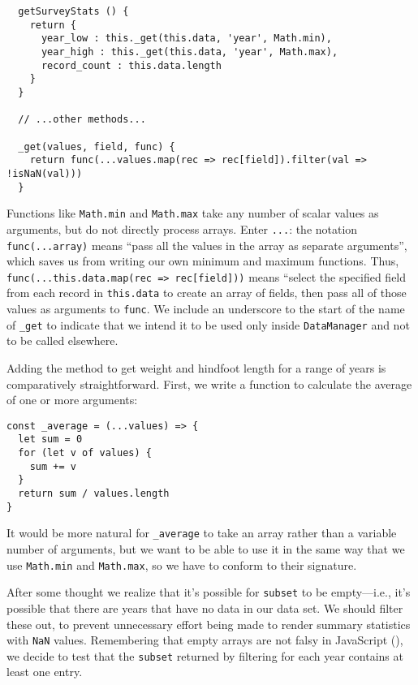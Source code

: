 \begin{verbatim}
  getSurveyStats () {
    return {
      year_low : this._get(this.data, 'year', Math.min),
      year_high : this._get(this.data, 'year', Math.max),
      record_count : this.data.length
    }
  }

  // ...other methods...

  _get(values, field, func) {
    return func(...values.map(rec => rec[field]).filter(val => !isNaN(val)))
  }
\end{verbatim}

Functions like \texttt{Math.min} and \texttt{Math.max} take any number of scalar values as arguments,
but do not directly process arrays.
Enter  \texttt{...}:
the notation \texttt{func(...array)} means
``pass all the values in the array as separate arguments'',
which saves us from writing our own minimum and maximum functions.
Thus,
\texttt{func(...this.data.map(rec\ =\textgreater{}\ rec[field]))} means
``select the specified field from each record in \texttt{this.data} to create an array of fields,
then pass all of those values as arguments to \texttt{func}.
We include an underscore to the start of the name of \texttt{\_get} to indicate that we
intend it to be used only inside \texttt{DataManager} and not to be called elsewhere.

Adding the method to get weight and hindfoot length for a range of years
is comparatively straightforward.
First,
we write a function to calculate the average of one or more arguments:

\begin{verbatim}
const _average = (...values) => {
  let sum = 0
  for (let v of values) {
    sum += v
  }
  return sum / values.length
}
\end{verbatim}

It would be more natural for \texttt{\_average} to take an array rather than a variable number of arguments,
but we want to be able to use it in the same way that we use \texttt{Math.min} and \texttt{Math.max},
so we have to conform to their signature.

After some thought we realize that it's possible for \texttt{subset} to be empty---i.e.,
it's possible that there are years that have no data in our data set.
We should filter these out,
to prevent unnecessary effort being made to render summary statistics
with \texttt{NaN} values.
Remembering that empty arrays are not falsy in JavaScript (),
we decide to test that the \texttt{subset} returned by filtering for each year
contains at least one entry.


